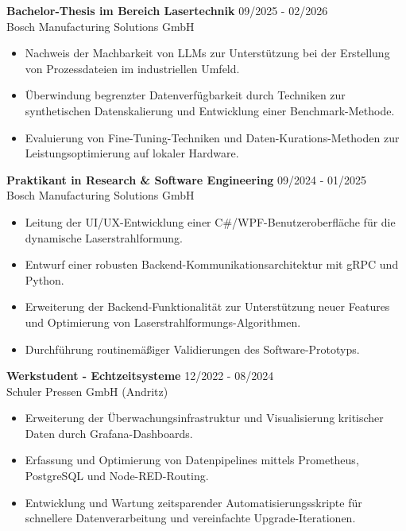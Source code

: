 \documentclass[10pt,a4paper]{article}
\begin{document}
\begin{minipage}[t]{0.66\textwidth}
    \textbf{Bachelor-Thesis im Bereich Lasertechnik} \hfill 09/2025 - 02/2026\\
    Bosch Manufacturing Solutions GmbH
    \vspace{-0.2em}
    \begin{itemize}
        \item Nachweis der Machbarkeit von LLMs zur Unterstützung bei der Erstellung von Prozessdateien im industriellen Umfeld.
        \item Überwindung begrenzter Datenverfügbarkeit durch Techniken zur synthetischen Datenskalierung und Entwicklung einer Benchmark-Methode.
        \item Evaluierung von Fine-Tuning-Techniken und Daten-Kurations-Methoden zur Leistungsoptimierung auf lokaler Hardware.
    \end{itemize}
    
    \vspace{0.6em}
    \textbf{Praktikant in Research \& Software Engineering} \hfill 09/2024 - 01/2025\\
    Bosch Manufacturing Solutions GmbH
    \vspace{-0.2em}
    \begin{itemize}
        \item Leitung der UI/UX-Entwicklung einer C\#/WPF-Benutzeroberfläche für die dynamische Laserstrahlformung.
        \item Entwurf einer robusten Backend-Kommunikationsarchitektur mit gRPC und Python.
        \item Erweiterung der Backend-Funktionalität zur Unterstützung neuer Features und Optimierung von Laserstrahlformungs-Algorithmen.
        \item Durchführung routinemäßiger Validierungen des Software-Prototyps.
    \end{itemize}

    \vspace{0.6em}
    \textbf{Werkstudent - Echtzeitsysteme} \hfill 12/2022 - 08/2024\\
    Schuler Pressen GmbH (Andritz)
    \vspace{-0.2em}
    \begin{itemize}
        \item Erweiterung der Überwachungsinfrastruktur und Visualisierung kritischer Daten durch Grafana-Dashboards.
        \item Erfassung und Optimierung von Datenpipelines mittels Prometheus, PostgreSQL und Node-RED-Routing.
        \item Entwicklung und Wartung zeitsparender Automatisierungsskripte für schnellere Datenverarbeitung und vereinfachte Upgrade-Iterationen.
    \end{itemize}

\end{minipage}
\end{document}

